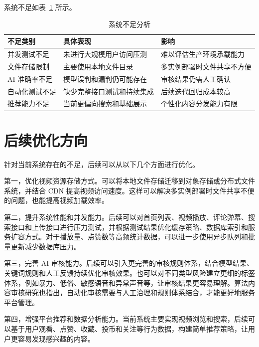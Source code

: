 系统不足如表~\ref{tab:project-limitations} 所示。

\begin{table}[htbp]
  \centering
  \caption{系统不足分析}
  \label{tab:project-limitations}
  \begin{tabular}{p{}p{}p{}}
    \hline
    \textbf{不足类别} & \textbf{具体表现} & \textbf{影响} \\
    \hline
    并发测试不足 & 未进行大规模用户访问压测 & 难以评估生产环境承载能力 \\
    文件存储限制 & 主要使用本地文件目录 & 多实例部署时文件共享不方便 \\
    AI 准确率不足 & 模型误判和漏判仍可能存在 & 审核结果仍需人工确认 \\
    自动化测试不足 & 缺少完整接口测试和持续集成 & 后续迭代回归成本较高 \\
    推荐能力不足 & 当前更偏向搜索和基础展示 & 个性化内容分发能力有限 \\
    \hline
  \end{tabular}
\end{table}

\section{后续优化方向}
\label{sec:future-work}

针对当前系统存在的不足，后续可以从以下几个方面进行优化。

第一，优化视频资源存储方式。可以将本地文件存储迁移到对象存储或分布式文件系统，并结合 CDN 提高视频访问速度。这样可以解决多实例部署时文件共享不便的问题，也能提高视频加载效率。

第二，提升系统性能和并发能力。后续可以对首页列表、视频播放、评论弹幕、搜索接口和上传接口进行压力测试，并根据测试结果优化缓存策略、数据库索引和服务扩容方式。对于播放量、点赞数等高频统计数据，可以进一步使用异步队列和批量更新减少数据库压力。

第三，完善 AI 审核能力。后续可以引入更完善的审核规则体系，结合模型结果、关键词规则和人工反馈持续优化审核效果。也可以对不同类型风险建立更细的标签体系，例如暴力、低俗、敏感语音和异常声音等，让审核结果更容易理解。算法内容审核研究也指出，自动化审核需要与人工治理和规则体系结合，才能更好地服务平台管理\cite{gorwa2020algorithmic}。

第四，增强平台推荐和数据分析能力。当前系统主要实现视频浏览和搜索，后续可以基于用户观看、点赞、收藏、投币和关注等行为数据，构建简单推荐策略，让用户更容易发现感兴趣的内容。

